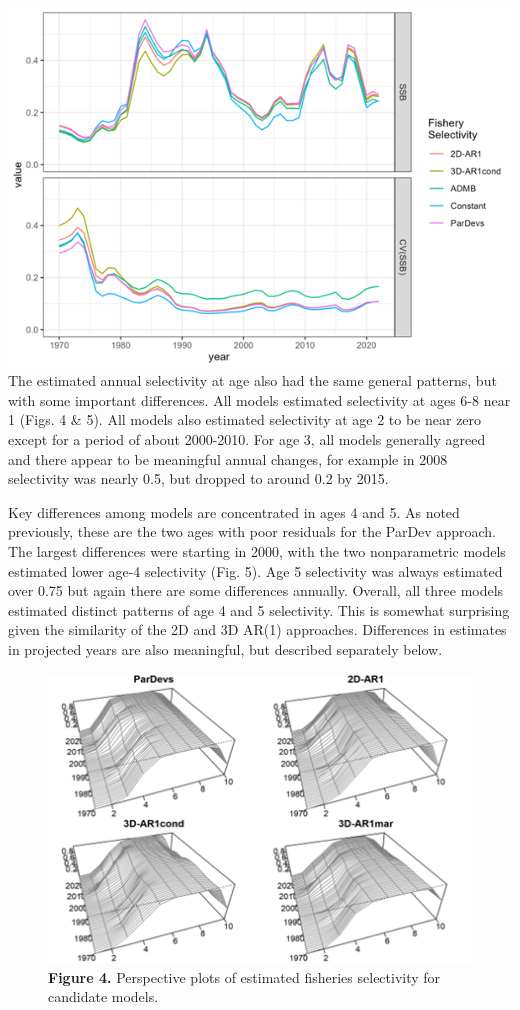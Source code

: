 \documentclass[
]{article}
\begin{document}
{{{\includegraphics{Results/Figure3_ssb_timeseries.png} The estimated
annual selectivity at age also had the same general patterns, but with
some important differences. All models estimated selectivity at ages 6-8
near 1 (Figs. 4 \& 5). All models also estimated selectivity at age 2 to
be near zero except for a period of about 2000-2010. For age 3, all
models generally agreed and there appear to be meaningful annual
changes, for example in 2008 selectivity was nearly 0.5, but dropped to
around 0.2 by 2015.

Key differences among models are concentrated in ages 4 and 5. As noted
previously, these are the two ages with poor residuals for the ParDev
approach. The largest differences were starting in 2000, with the two
nonparametric models estimated lower age-4 selectivity (Fig. 5). Age 5
selectivity was always estimated over 0.75 but again there are some
differences annually. Overall, all three models estimated distinct
patterns of age 4 and 5 selectivity. This is somewhat surprising given
the similarity of the 2D and 3D AR(1) approaches. Differences in
estimates in projected years are also meaningful, but described
separately below.

\begin{figure}
\hypertarget{fig:figure4}{%
\centering
\includegraphics{Results/Figure4_annual_selectivity.png}
\caption{\textbf{Figure 4.} Perspective plots of estimated fisheries
selectivity for candidate models.}\label{fig:figure4}
}
\end{figure}

}}}
\end{document}
